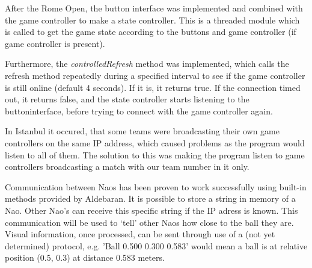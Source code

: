 \documentclass[a4paper]{article}
\begin{document}
After the Rome Open, the button interface was implemented and combined with the game controller to make a state controller. This is a threaded module which is called to get the game state according to the buttons and game controller (if game controller is present).

Furthermore, the \textit{controlledRefresh} method was implemented, which calls the refresh method repeatedly during a specified interval to see if the game controller is still online (default 4 seconds). If it is, it returns true. If the connection timed out, it returns false, and the state controller starts listening to the buttoninterface, before trying to connect with the game controller again.

In Istanbul it occured, that some teams were broadcasting their own game controllers on the same IP address, which caused problems as the program would listen to all of them. The solution to this was making the program listen to game controllers broadcasting a match with our team number in it only.  

Communication between Naos has been proven to work successfully using built-in methods provided by Aldebaran. It is possible to store a string in memory of a Nao. Other Nao's can receive this specific string if the IP adress is known. This communication will be used to `tell' other Naos how close to the ball they are. Visual information, once processed, can be sent through use of a (not yet determined) protocol, e.g. 'Ball 0.500 0.300 0.583' would mean a ball is at relative position (0.5, 0.3) at distance 0.583 meters.
\end{document}
